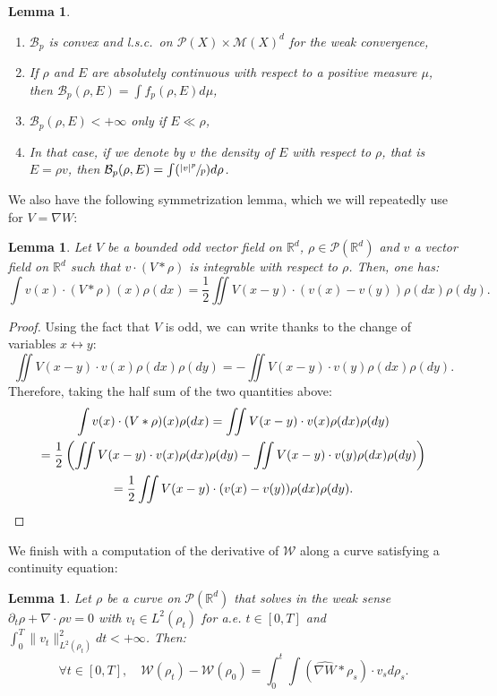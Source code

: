 \documentclass[11pt]{article}
\newcommand{\skpt}{\smallskip}
\numberwithin{equation}{section}
\newenvironment{enumeratei}
{\bgroup\def\theenumi{\roman{enumi}}\def\theenumii{\arabic{enumii}}\begin{enumerate}}
{\end{enumerate}\egroup}
\newcommand{\Psfrac}[2]{(\sfrac{#1}{#2})}
\def\RR{\mathbb{R}}
\def\pa{\partial}
\def\calB{{\mathcal B}}
\def\calM{{\mathcal M}}
\def\calP{{\mathcal P}}
\def\calW{{\mathcal W}}
\def\nabWchapo{\widehat{\nabla W}}
\theoremstyle{plain}
\newtheorem{lemma}[theorem]{Lemma}
\theoremstyle{definition}
\begin{document}
\skpt
\begin{lemma}\label{lemma:BenamouBrenier}
\begin{enumeratei}
\item $\calB_p$ is convex and l.s.c.\ on $\calP(X) \times \calM(X)^d$ for the weak convergence,
\item If $\rho$ and $E$ are absolutely continuous with respect to a positive measure $\mu$, then $\calB_p(\rho, E) = \int f_p(\rho, E) d\mu$,
\item $\calB_p(\rho, E) < +\infty$ only if $E \ll \rho$,
\item In that case, if we denote by $v$ the density of $E$ with respect to $\rho$, that is $E = \rho v$, then $\calB_p(\rho, E) = \int \Psfrac{|v|^p}{p} d\rho$.
\end{enumeratei}
\end{lemma}
We also have the following symmetrization lemma, which we will repeatedly use for $V = \nabla W$:
\begin{lemma}\label{lemma:symmetrization}
Let $V$ be a bounded odd vector field on $\RR^d$, $\rho \in \calP(\RR^d)$ and $v$ a vector field on $\RR^d$ such that $v \cdot (V * \rho)$ is integrable with respect to $\rho$. Then, one has:
\[
\int v(x) \cdot (V * \rho)(x) \rho(dx) = \frac{1}{2} \iint V(x-y) \cdot (v(x)-v(y)) \rho(dx) \rho(dy).
\]
\end{lemma}
\begin{proof}
Using the fact that $V$ is odd, we~can write thanks to the change of variables $x \leftrightarrow y$:
\[
\iint V(x-y) \cdot v(x) \rho(dx) \rho(dy) = - \iint V(x-y) \cdot v(y) \rho(dx) \rho(dy).
\]
Therefore, taking the half sum of the two quantities above:
\begin{multline*}
\int v(x) \cdot (V * \rho)(x) \rho(dx) = \iint V(x-y) \cdot v(x) \rho(dx) \rho(dy) \\
= \frac 12 \left(\iint V(x-y) \cdot v(x) \rho(dx) \rho(dy)
- \iint V(x-y) \cdot v(y) \rho(dx) \rho(dy) \right) \\
= \frac{1}{2} \iint V(x-y) \cdot (v(x)-v(y)) \rho(dx) \rho(dy).\qedhere
\end{multline*}
\end{proof}
We finish with a computation of the derivative of $\calW$ along a curve satisfying a continuity equation:
\begin{lemma}\label{lemma:derEnergieInteraction}
Let $\rho$ be a curve on $\calP(\RR^d)$ that solves in the weak sense $\pa_t \rho + \nabla \cdot \rho v = 0$ with $v_t \in L^2(\rho_t)$ for a.e. $t \in [0,T]$ and $\int_0^T \|v_t\|_{L^2(\rho_t)}^2 dt < +\infty$. Then:
\begin{equation*}\label{eq:derEnergieInteraction}
\forall t \in [0,T], \quad \calW(\rho_t) - \calW(\rho_0) = \int_0^t \int (\nabWchapo * \rho_s) \cdot v_s d\rho_s.
\end{equation*}
\end{lemma}
\end{document}

